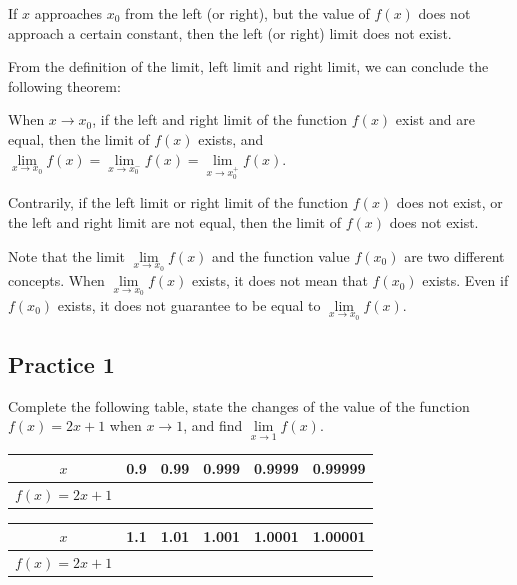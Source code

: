 \documentclass[12pt]{report}
\begin{document}
If $x$ approaches $x_0$ from the left (or right), but the value of $f (x)$ does
not approach a certain constant, then the left (or right) limit does not exist.

From the definition of the limit, left limit and right limit, we can conclude
the following theorem:
\begin{mdframed}[style=MyFrame]
  When $x \to x_0$, if the left and right limit of the function $f (x)$ exist and are equal, then the limit of $f (x)$ exists, and $\lim\limits_{x \to x_0} f (x) = \lim\limits_{x \to x_0^-} f (x) = \lim\limits_{x \to x_0^+} f (x)$.

  Contrarily, if the left limit or right limit of the function $f (x)$ does not
  exist, or the left and right limit are not equal, then the limit of $f (x)$
  does not exist.
\end{mdframed}

Note that the limit $\lim\limits_{x \to x_0} f (x)$ and the function value $f
  (x_0)$ are two different concepts. When $\lim\limits_{x \to x_0} f (x)$ exists,
it does not mean that $f (x_0)$ exists. Even if $f (x_0)$ exists, it does not
guarantee to be equal to $\lim\limits_{x \to x_0} f (x)$.

\subsection{Practice 1}

Complete the following table, state the changes of the value of the function $f
  (x) = 2x + 1$ when $x \to 1$, and find $\lim\limits_{x \to 1} f (x)$.

\begin{center}
  \begin{tabular}{|c|c|c|c|c|c|}
    \hline
    $x$              & 0.9 & 0.99 & 0.999 & 0.9999 & 0.99999 \\
    \hline
    $f (x) = 2x + 1$ &     &      &       &        &         \\
    \hline
  \end{tabular}
\end{center}
\begin{center}
  \begin{tabular}{|c|c|c|c|c|c|}
    \hline
    $x$              & 1.1 & 1.01 & 1.001 & 1.0001 & 1.00001 \\
    \hline
    $f (x) = 2x + 1$ &     &      &       &        &         \\
    \hline
  \end{tabular}
\end{center}
\end{document}
